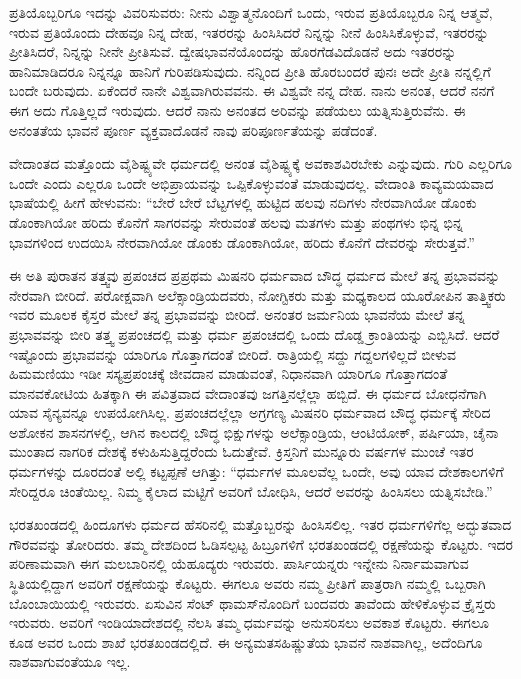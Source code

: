 ಪ್ರತಿಯೊಬ್ಬರಿಗೂ ಇದನ್ನು ವಿವರಿಸುವರು: ನೀನು ವಿಶ್ವಾತ್ಮನೊಂದಿಗೆ ಒಂದು, ಇರುವ ಪ್ರತಿಯೊಬ್ಬರೂ ನಿನ್ನ ಆತ್ಮವೆ, ಇರುವ ಪ್ರತಿಯೊಂದು ದೇಹವೂ ನಿನ್ನ ದೇಹ, ಇತರರನ್ನು ಹಿಂಸಿಸಿದರೆ ನಿನ್ನನ್ನು ನೀನೆ ಹಿಂಸಿಸಿಕೊಳ್ಳುವೆ, ಇತರರನ್ನು ಪ್ರೀತಿಸಿದರೆ, ನಿನ್ನನ್ನು ನೀನೇ ಪ್ರೀತಿಸುವೆ. ದ್ವೇಷಭಾವನೆಯೊಂದನ್ನು ಹೊರಗೆಡವಿದೊಡನೆ ಅದು ಇತರರನ್ನು ಹಾನಿಮಾಡಿದರೂ ನಿನ್ನನ್ನೂ ಹಾನಿಗೆ ಗುರಿಪಡಿಸುವುದು. ನನ್ನಿಂದ ಪ್ರೀತಿ ಹೊರಬಂದರೆ ಪುನಃ ಅದೇ ಪ್ರೀತಿ ನನ್ನಲ್ಲಿಗೆ ಬಂದೇ ಬರುವುದು. ಏಕೆಂದರೆ ನಾನೇ ವಿಶ್ವವಾಗಿರುವವನು. ಈ ವಿಶ್ವವೇ ನನ್ನ ದೇಹ. ನಾನು ಅನಂತ, ಆದರೆ ನನಗೆ ಈಗ ಅದು ಗೊತ್ತಿಲ್ಲದೆ ಇರುವುದು. ಆದರೆ ನಾನು ಅನಂತದ ಅರಿವನ್ನು ಪಡೆಯಲು ಯತ್ನಿಸುತ್ತಿರುವೆನು. ಈ ಅನಂತತೆಯ ಭಾವನೆ ಪೂರ್ಣ ವ್ಯಕ್ತವಾದೊಡನೆ ನಾವು ಪರಿಪೂರ್ಣತೆಯನ್ನು ಪಡೆದಂತೆ.

ವೇದಾಂತದ ಮತ್ತೊಂದು ವೈಶಿಷ್ಟ್ಯವೇ ಧರ್ಮದಲ್ಲಿ ಅನಂತ ವೈಶಿಷ್ಟ್ಯಕ್ಕೆ ಅವಕಾಶವಿರಬೇಕು ಎನ್ನುವುದು. ಗುರಿ ಎಲ್ಲರಿಗೂ ಒಂದೇ ಎಂದು ಎಲ್ಲರೂ ಒಂದೇ ಅಭಿಪ್ರಾಯವನ್ನು ಒಪ್ಪಿಕೊಳ್ಳುವಂತೆ ಮಾಡುವುದಲ್ಲ. ವೇದಾಂತಿ ಕಾವ್ಯಮಯವಾದ ಭಾಷೆಯಲ್ಲಿ ಹೀಗೆ ಹೇಳುವನು: “ಬೇರೆ ಬೇರೆ ಬೆಟ್ಟಗಳಲ್ಲಿ ಹುಟ್ಟಿದ ಹಲವು ನದಿಗಳು ನೇರವಾಗಿಯೋ ಡೊಂಕು ಡೊಂಕಾಗಿಯೋ ಹರಿದು ಕೊನೆಗೆ ಸಾಗರವನ್ನು ಸೇರುವಂತೆ ಹಲವು ಮತಗಳು ಮತ್ತು ಪಂಥಗಳು ಭಿನ್ನ ಭಿನ್ನ ಭಾವಗಳಿಂದ ಉದಯಿಸಿ ನೇರವಾಗಿಯೋ ಡೊಂಕು ಡೊಂಕಾಗಿಯೋ, ಹರಿದು ಕೊನೆಗೆ ದೇವರನ್ನು ಸೇರುತ್ತವೆ.”

\newpage

ಈ ಅತಿ ಪುರಾತನ ತತ್ತ್ವವು ಪ್ರಪಂಚದ ಪ್ರಪ್ರಥಮ ಮಿಷನರಿ ಧರ್ಮವಾದ ಬೌದ್ಧ ಧರ್ಮದ ಮೇಲೆ ತನ್ನ ಪ್ರಭಾವವನ್ನು ನೇರವಾಗಿ ಬೀರಿದೆ. ಪರೋಕ್ಷವಾಗಿ ಅಲೆಕ್ಸಾಂಡ್ರಿಯದವರು, ನೋಗ್ಟಿಕರು ಮತ್ತು ಮಧ್ಯಕಾಲದ ಯೂರೋಪಿನ ತಾತ್ತ್ವಿಕರು ಇವರ ಮೂಲಕ ಕೈಸ್ತರ ಮೇಲೆ ತನ್ನ ಪ್ರಭಾವವನ್ನು ಬೀರಿದೆ. ಅನಂತರ ಜರ್ಮನಿಯ ಭಾವನೆಯ ಮೇಲೆ ತನ್ನ ಪ್ರಭಾವವನ್ನು ಬೀರಿ ತತ್ತ್ವ ಪ್ರಪಂಚದಲ್ಲಿ ಮತ್ತು ಧರ್ಮ ಪ್ರಪಂಚದಲ್ಲಿ ಒಂದು ದೊಡ್ಡ ಕ್ರಾಂತಿಯನ್ನು ಎಬ್ಬಿಸಿದೆ. ಆದರೆ ಇಷ್ಟೊಂದು ಪ್ರಭಾವವನ್ನು ಯಾರಿಗೂ ಗೊತ್ತಾಗದಂತೆ ಬೀರಿದೆ. ರಾತ್ರಿಯಲ್ಲಿ ಸದ್ದು ಗದ್ದಲಗಳಿಲ್ಲದೆ ಬೀಳುವ ಹಿಮಮಣಿಯು ಇಡೀ ಸಸ್ಯಪ್ರಪಂಚಕ್ಕೆ ಜೀವದಾನ ಮಾಡುವಂತೆ, ನಿಧಾನವಾಗಿ ಯಾರಿಗೂ ಗೊತ್ತಾಗದಂತೆ ಮಾನವಕೋಟಿಯ ಹಿತಕ್ಕಾಗಿ ಈ ಪವಿತ್ರವಾದ ವೇದಾಂತವು ಜಗತ್ತಿನಲ್ಲೆಲ್ಲಾ ಹಬ್ಬಿದೆ. ಈ ಧರ್ಮದ ಬೋಧನೆಗಾಗಿ ಯಾವ ಸೈನ್ಯವನ್ನೂ ಉಪಯೋಗಿಸಿಲ್ಲ. ಪ್ರಪಂಚದಲ್ಲೆಲ್ಲಾ ಅಗ್ರಗಣ್ಯ ಮಿಷನರಿ ಧರ್ಮವಾದ ಬೌದ್ಧ ಧರ್ಮಕ್ಕೆ ಸೇರಿದ ಅಶೋಕನ ಶಾಸನಗಳಲ್ಲಿ, ಆಗಿನ ಕಾಲದಲ್ಲಿ ಬೌದ್ಧ ಭಿಕ್ಷುಗಳನ್ನು ಅಲೆಕ್ಸಾಂಡ್ರಿಯ, ಆಂಟಿಯೋಕ್, ಪರ್ಷಿಯಾ, ಚೈನಾ ಮುಂತಾದ ನಾಗರಿಕ ದೇಶಕ್ಕೆ ಕಳುಹಿಸುತ್ತಿದ್ದರೆಂದು ಓದುತ್ತೇವೆ. ಕ್ರಿಸ್ತನಿಗೆ ಮುನ್ನೂರು ವರ್ಷಗಳ ಮುಂಚೆ ಇತರ ಧರ್ಮಗಳನ್ನು ದೂರದಂತೆ ಅಲ್ಲಿ ಕಟ್ಟಪ್ಪಣೆ ಆಗಿತ್ತು: “ಧರ್ಮಗಳ ಮೂಲವೆಲ್ಲ ಒಂದೇ, ಅವು ಯಾವ ದೇಶಕಾಲಗಳಿಗೆ ಸೇರಿದ್ದರೂ ಚಿಂತೆಯಿಲ್ಲ. ನಿಮ್ಮ ಕೈಲಾದ ಮಟ್ಟಿಗೆ ಅವರಿಗೆ ಬೋಧಿಸಿ, ಆದರೆ ಅವರನ್ನು ಹಿಂಸಿಸಲು ಯತ್ನಿಸಬೇಡಿ.”

ಭರತಖಂಡದಲ್ಲಿ ಹಿಂದೂಗಳು ಧರ್ಮದ ಹೆಸರಿನಲ್ಲಿ ಮತ್ತೊಬ್ಬರನ್ನು ಹಿಂಸಿಸಲಿಲ್ಲ. ಇತರ ಧರ್ಮಗಳಿಗೆಲ್ಲ ಅದ್ಭುತವಾದ ಗೌರವವನ್ನು ತೋರಿದರು. ತಮ್ಮ ದೇಶದಿಂದ ಓಡಿಸಲ್ಪಟ್ಟ ಹಿಬ್ರೂಗಳಿಗೆ ಭರತಖಂಡದಲ್ಲಿ ರಕ್ಷಣೆಯನ್ನು ಕೊಟ್ಟರು. ಇದರ ಪರಿಣಾಮವಾಗಿ ಈಗ ಮಲಬಾರಿನಲ್ಲಿ ಯೆಹೂದ್ಯರು ಇರುವರು. ಪಾರ್ಸಿಯನ್ನರು ಇನ್ನೇನು ನಿರ್ನಾಮವಾಗುವ ಸ್ಥಿತಿಯಲ್ಲಿದ್ದಾಗ ಅವರಿಗೆ ರಕ್ಷಣೆಯನ್ನು ಕೊಟ್ಟರು. ಈಗಲೂ ಅವರು ನಮ್ಮ ಪ್ರೀತಿಗೆ ಪಾತ್ರರಾಗಿ ನಮ್ಮಲ್ಲಿ ಒಬ್ಬರಾಗಿ ಬೊಂಬಾಯಿಯಲ್ಲಿ ಇರುವರು. ಏಸುವಿನ ಸೆಂಟ್ ಥಾಮಸ್‌ನೊಂದಿಗೆ ಬಂದವರು ತಾವೆಂದು ಹೇಳಿಕೊಳ್ಳುವ ಕ್ರೈಸ್ತರು ಇರುವರು. ಅವರಿಗೆ ಇಂಡಿಯಾದೇಶದಲ್ಲಿ ನೆಲಸಿ ತಮ್ಮ ಧರ್ಮವನ್ನು ಅನುಸರಿಸಲು ಅವಕಾಶ ಕೊಟ್ಟರು. ಈಗಲೂ ಕೂಡ ಅವರ ಒಂದು ಶಾಖೆ ಭರತಖಂಡದಲ್ಲಿದೆ. ಈ ಅನ್ಯಮತಸಹಿಷ್ಣುತೆಯ ಭಾವನೆ ನಾಶವಾಗಿಲ್ಲ, ಅದೆಂದಿಗೂ ನಾಶವಾಗುವಂತೆಯೂ ಇಲ್ಲ.

